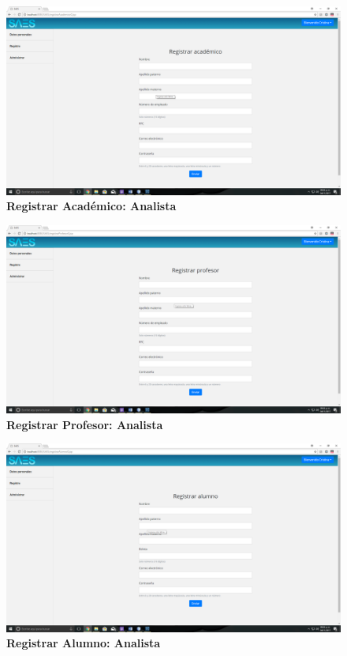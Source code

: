 \begin{figure}[H]
  \centering
    \includegraphics[scale=0.2]{project/images/33.png}
  \caption{\textbf{Registrar Académico: Analista}}
\end{figure}
\begin{figure}[H]
  \centering
    \includegraphics[scale=0.2]{project/images/34.png}
  \caption{\textbf{Registrar Profesor: Analista}}
\end{figure}
\begin{figure}[H]
  \centering
    \includegraphics[scale=0.2]{project/images/35.png}
  \caption{\textbf{Registrar Alumno: Analista}}
\end{figure}
